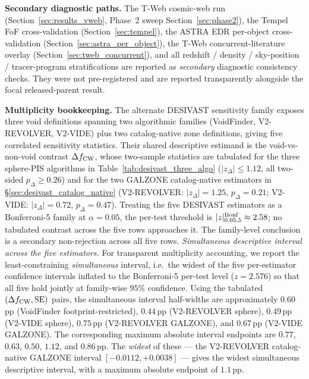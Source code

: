 \documentclass[twocolumn,linenumbers]{aastex702}
\begin{document}
\textbf{Secondary diagnostic paths.} The T-Web cosmic-web run
(Section~\ref{sec:results_vweb}, Phase~2 sweep
Section~\ref{sec:phase2}), the Tempel FoF cross-validation
(Section~\ref{sec:tempel}), the ASTRA EDR per-object
cross-validation (Section~\ref{sec:astra_per_object}), the
T-Web concurrent-literature overlay
(Section~\ref{sec:tweb_concurrent}), and all redshift / density /
sky-position / tracer-program stratifications are reported as
\emph{secondary} diagnostic consistency checks. They were not
pre-registered and are reported transparently alongside the focal
released-parent result.

\textbf{Multiplicity bookkeeping.} The alternate DESIVAST sensitivity family
exposes three void definitions spanning two algorithmic families (VoidFinder,
V2-REVOLVER, V2-VIDE) plus two catalog-native zone definitions, giving
five correlated sensitivity statistics. Their shared descriptive estimand
is the void-vs-non-void contrast $\Delta f_{\rm CW}$, whose two-sample
statistics are tabulated for the three sphere-PIS algorithms in
Table~\ref{tab:desivast_three_algo} ($|z_\Delta| \leq 1.12$, all
two-sided $p_\Delta \geq 0.26$) and for the two GALZONE catalog-native
estimators in \S\ref{sec:desivast_catalog_native}
(V2-REVOLVER: $|z_\Delta| = 1.25$, $p_\Delta = 0.21$;
V2-VIDE: $|z_\Delta| = 0.72$, $p_\Delta = 0.47$). Treating the five
DESIVAST estimators as a Bonferroni-5 family at $\alpha = 0.05$, the
per-test threshold is $|z|^{\rm Bonf}_{0.05,5} \approx 2.58$; no
tabulated contrast across the five rows approaches it. The
family-level conclusion is a secondary non-rejection across all five rows.
\emph{Simultaneous descriptive interval across the five estimators.}
For transparent multiplicity accounting, we report the least-constraining
\emph{simultaneous} interval, i.e.\ the widest of the five per-estimator
confidence intervals inflated to the Bonferroni-5 per-test level
($z = 2.576$) so that all five hold jointly at family-wise $95\%$
confidence. Using the tabulated $(\Delta f_{\rm CW}, {\rm SE})$ pairs,
the simultaneous interval half-widths are approximately $0.60$\,pp
(VoidFinder footprint-restricted), $0.44$\,pp (V2-REVOLVER sphere),
$0.49$\,pp (V2-VIDE sphere), $0.75$\,pp (V2-REVOLVER GALZONE), and
$0.67$\,pp (V2-VIDE GALZONE). The corresponding maximum absolute
interval endpoints are $0.77$, $0.63$, $0.50$, $1.12$, and $0.86$\,pp.
The
\emph{widest} of these --- the V2-REVOLVER catalog-native GALZONE
interval $[-0.0112, +0.0038]$ --- gives the widest simultaneous
descriptive interval, with a maximum absolute endpoint of $1.1$\,pp.
\end{document}
